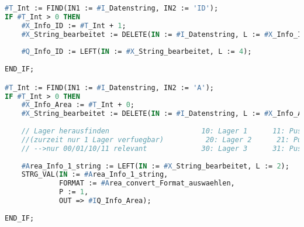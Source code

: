     \begin{lstlisting}[language=Pascal, caption={SCL Baustein \enquote{ID+Area}}, label = SCL-Baustein]
        #T_Int := FIND(IN1 := #I_Datenstring, IN2 := 'ID');
IF #T_Int > 0 THEN
    #X_Info_ID := #T_Int + 1;
    #X_String_bearbeitet := DELETE(IN := #I_Datenstring, L := #X_Info_ID, P := 1); //Alles bis inkl. X wegschneiden
    
    #Q_Info_ID := LEFT(IN := #X_String_bearbeitet, L := 4);               // 4 Zeichen links von X nehmen
    
END_IF;

#T_Int := FIND(IN1 := #I_Datenstring, IN2 := 'A');
IF #T_Int > 0 THEN
    #X_Info_Area := #T_Int + 0;
    #X_String_bearbeitet := DELETE(IN := #I_Datenstring, L := #X_Info_Area, P := 1);
    
    // Lager herausfinden                      10: Lager 1      11: Puscher (Lager 1)       00: Komissionierstation
    //(zurzeit nur 1 Lager verfuegbar)          20: Lager 2      21: Puscher (Lager 2)       01: Foerderband
    // -->nur 00/01/10/11 relevant             30: Lager 3      31: Puscher (Lager 3)
    
    #Area_Info_1_string := LEFT(IN := #X_String_bearbeitet, L := 2);
    STRG_VAL(IN := #Area_Info_1_string,                                         
             FORMAT := #Area_convert_Format_auswaehlen,
             P := 1,
             OUT => #IQ_Info_Area);
    
END_IF;
    \end{lstlisting}

\newpage

